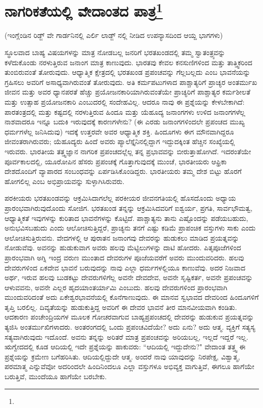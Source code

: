 
\chapter[ನಾಗರಿಕತೆಯಲ್ಲಿ ವೇದಾಂತದ ಪಾತ್ರ]{ನಾಗರಿಕತೆಯಲ್ಲಿ ವೇದಾಂತದ ಪಾತ್ರ\protect\footnote{}}

\begin{center}
(ಇಂಗ್ಲೆಂಡಿನ ರಿಡ್ಜ್ ವೇ ಗಾರ್ಡನಿನಲ್ಲಿ ಎರ್ಲಿ ಲಾಡ್ಜ್ ನಲ್ಲಿ ನೀಡಿದ ಉಪನ್ಯಾಸದಿಂದ ಆಯ್ದ ಭಾಗಗಳು)
\end{center}

ಸ್ಥೂಲವಾದ ಬಾಹ್ಯ ವಿಷಯಗಳನ್ನು ಮಾತ್ರ ನೋಡಬಲ್ಲ ಜನರಿಗೆ ಭರತಖಂಡದಲ್ಲಿ ತಮ್ಮ ಸ್ವಾತಂತ್ರ್ಯವನ್ನು ಕಳೆದುಕೊಂಡು ನರಳುತ್ತಿರುವ ಜನಾಂಗ ಮಾತ್ರ ಕಾಣುವುದು. ಭಾರತವು ಕೇವಲ ಕನಸುಣಿಗಳಿಂದ ಮತ್ತು ತಾತ್ತ್ವಿಕರಿಂದ ತುಂಬಿರುವಂತೆ ತೋರುವುದು. ಆಧ್ಯಾತ್ಮಿಕ ಕ್ಷೇತ್ರದಲ್ಲಿ ಭರತಖಂಡ ಪ್ರಪಂಚವನ್ನು ಗೆಲ್ಲಬಲ್ಲದು ಎಂಬ ಭಾವನೆಯನ್ನು ಗ್ರಹಿಸಲು ಅವರಿಗೆ ಅಸಾಧ್ಯವಾಗಿರುವಂತೆ ತೋರುವುದು. ಅತಿ ಕರ್ಮಪಟುಗಳಾದ ಪಾಶ್ಚಾತ್ಯರಿಗೆ ಪ್ರಾಚ್ಯರ ಅಂತರ್ಮುಖ ಜೀವನ ಮತ್ತು ಅವರ ಧ್ಯಾನಪರತೆ ಹೆಚ್ಚು ಪ್ರಯೋಜನಕಾರಿಯಾಗಿರುವಂತೆಯೇ ಪ್ರಾಚ್ಯರಿಗೆ ಪಾಶ್ಚಾತ್ಯರ ಕರ್ಮಶೀಲತೆ ಮತ್ತು ಉತ್ಸಾಹ ಪ್ರಯೋಜನಕಾರಿ ಎಂಬುದರಲ್ಲಿ ಸಂದೇಹವಿಲ್ಲ. ಆದರೂ ನಾವು ಈ ಪ್ರಶ್ನೆಯನ್ನು ಕೇಳಬೇಕಾಗಿದೆ: ಪಾರತಂತ್ರದಲ್ಲಿ ಮತ್ತು ಕಷ್ಟದಲ್ಲಿ ನರಳುತ್ತಿರುವ ಹಿಂದೂ ಮತ್ತು ಯೆಹೂದ್ಯ ಜನಾಂಗಗಳು ಉಳಿದ ಜನಾಂಗಗಳೆಲ್ಲ ನಾಶವಾದರೂ ಇನ್ನೂ ಬದುಕಿ ಇರುವುದಕ್ಕೆ ಕಾರಣಗಳೇನು? (ಈ ಎರಡು ಜನಾಂಗಗಳಿಂದಲೇ ಪ್ರಪಂಚದ ಮುಖ್ಯ ಧರ್ಮಗಳೆಲ್ಲ ಜನಿಸಿದುವು) ಇದಕ್ಕೆ ಉತ್ತರವೇ ಅವರ ಆಧ್ಯಾತ್ಮಿಕ ಶಕ್ತಿ. ಹಿಂದೂಗಳು ಈಗ ಮೌನವಾಗಿದ್ದರೂ ಜೀವಂತರಾಗಿರುವರು; ಯೆಹೂದ್ಯರು ಹಿಂದೆ ಅವರು ಪ್ಯಾಲೆಸ್ತೈನಿನಲ್ಲಿದ್ದಾಗ ಇದ್ದುದಕ್ಕಿಂತ ಹೆಚ್ಚಿನ ಸಂಖ್ಯೆಯಲ್ಲಿ ಇರುವರು. ಭಾರತೀಯ ತತ್ತ್ವಜ್ಞಾನ ನಾಗರಿಕ ಪ್ರಪಂಚದಲ್ಲೆಲ್ಲ ತನ್ನ ಪ್ರಭಾವವನ್ನು ಬೀರುತ್ತಾಹೋಗಿದೆ. ಇದರಂತೆಯೇ ಪೂರ್ವಕಾಲದಲ್ಲಿ, ಯೂರೋಪಿನ ಹೆಸರು ಪ್ರಪಂಚಕ್ಕೆ ಗೊತ್ತಾಗುವುದಕ್ಕೆ ಮುಂಚೆ, ಭಾರತೀಯರು ಆಫ್ರಿಕಾ ದೇಶದೊಂದಿಗೆ ವ್ಯಾಪಾರದ ಸಂಬಂಧವನ್ನು ಏರ್ಪಡಿಸಿಕೊಂಡಿದ್ದರು. ಭಾರತೀಯರು ತಮ್ಮ ದೇಶ ಬಿಟ್ಟು ಹೊರಗೆ ಹೋಗಲಿಲ್ಲ ಎಂಬ ಅಭಿಪ್ರಾಯವನ್ನು ಸುಳ್ಳಾಗಿಸಿರುವರು.

ಪರಕೀಯರು ಭರತಖಂಡವನ್ನು ಆಕ್ರಮಿಸಿದಾಗಲೆಲ್ಲ ಪರಕೀಯರ ಜೀವನಗತಿಯಲ್ಲಿ ಹೊಸದೊಂದು ಅಧ್ಯಾಯ ಪ್ರಾರಂಭವಾಗಿರುವುದೊಂದು ಸೋಜಿಗ. ಭರತಖಂಡ ತನ್ನನ್ನು ಆಕ್ರಮಿಸಿದವರಿಗೆ ಐಶ್ವರ್ಯ, ಪ್ರಗತಿ, ಸಾರ್ವಭೌಮತ್ವ, ಆಧ್ಯಾತ್ಮಿಕತೆ ಇವುಗಳನ್ನು ಕುರಿತಾದ ಭಾವನೆಗಳನ್ನು ಕೊಟ್ಟಿದೆ. ಪಾಶ್ಚಾತ್ಯನು ತಾನು ಎಷ್ಟೊಂದನ್ನು ಪಡೆಯಬಹುದು, ಅನುಭವಿಸಬಹುದು ಎಂದು ಆಲೋಚಿಸುತ್ತಿದ್ದರೆ, ಪ್ರಾಚ್ಯನು ತನಗೆ ಎಷ್ಟು ಕಡಿಮೆ ಪ್ರಾಪಂಚಿಕ ವಸ್ತುಗಳು ಸಾಕು ಎಂದು ಆಲೋಚಿಸುತ್ತಿರುವನು. ವೇದಗಳಲ್ಲಿ ಆ ಪುರಾತನ ಜನಾಂಗವು ದೇವರನ್ನು ಹುಡುಕಲು ಮಾಡಿದ ಪ್ರಯತ್ನವನ್ನು ನೋಡುವೆವು. ಅವನನ್ನು ಹುಡುಕುವಾಗ ಅವರು ಹಲವು ಮೆಟ್ಟಿಲುಗಳನ್ನು ದಾಟಿ ಹೋದರು. ಪಿತೃಪೂಜೆಗಳಿಂದ ಪ್ರಾರಂಭವಾಗಿ ಅಗ್ನಿ ಇಂದ್ರ ವರುಣ ಮುಂತಾದ ದೇವರುಗಳ ಪೂಜೆಯವರೆಗೆ ಅವರು ಮುಂದುವರಿದರು. ಹಲವು ದೇವರುಗಳಿಂದ ಏಕದೇವ ಭಾವನೆ ಬರುವುದನ್ನು ನಾವು ಎಲ್ಲಾ ಧರ್ಮಗಳಲ್ಲಿಯೂ ಕಾಣುವೆವು. ಅದರ ನಿಜವಾದ ಅರ್ಥ, ಇರುವ ಹಲವು ಬುಡಕಟ್ಟು ದೇವರುಗಳಿಗೆಲ್ಲ ಅವನೇ ದೇವದೇವ, ಅವನೇ ಸೃಷ್ಟಿಕರ್ತ, ಅವನೇ ಪ್ರಪಂಚವನ್ನು ಆಳುವವನು, ಅವನೇ ಎಲ್ಲರ ಹೃದಯಾಂತರ್ಯಾಮಿ ಎಂಬುದು. ಹಲವು ದೇವರುಗಳಿಂದ ಪ್ರಾರಂಭವಾಗಿ ಮುಂದುವರಿದಂತೆ ಅದು ಏಕೇಶ್ವರಭಾವನೆಯಲ್ಲಿ ಕೊನೆಗಾಣುವುದು. ಈ ಮಾನವ ಸ್ವಭಾವದ ದೇವರಿಂದ ಹಿಂದೂಗಳಿಗೆ ತೃಪ್ತಿ ಬರಲಿಲ್ಲ. ದಿವ್ಯತೆಯನ್ನು ಹುಡುಕುತ್ತಿದ್ದ ಅವರಿಗೆ ಈ ದೇವರ ಭಾವನೆ ತೀರ ಮಾನವೀಯವಾಗಿ ಕಂಡಿತು. ಆದಕಾರಣ ಪಂಚೇಂದ್ರಿಯಗಳ ಮೂಲಕ ಗೋಚರವಾಗುವ ಬಾಹ್ಯಪ್ರಪಂಚದಲ್ಲಿ ದೇವರನ್ನು ಹುಡುಕುವ ಪ್ರಯತ್ನವನ್ನು ತ್ಯಜಿಸಿ ಅಂತರ್ಮುಖಿಗಳಾದರು. ಅಂತರಂಗದಲ್ಲಿ ಒಂದು ಪ್ರಪಂಚವಿದೆಯೇ? ಅದು ಏನು? ಅದು ಆತ್ಮ. ವ್ಯಕ್ತಿಗೆ ಸತ್ಯಸ್ಯ ಸತ್ಯವಾಗಿರುವುದು ಇದೊಂದೆ. ಅವನು ತನ್ನನ್ನು ಅರಿತರೆ ಮಾತ್ರ ಪ್ರಪಂಚವನ್ನು ಅರಿಯಬಲ್ಲ, ಇಲ್ಲದೆ ಇದ್ದರೆ ಇಲ್ಲ. ಋಗ್ವೇದದಲ್ಲಿ ಕೂಡ ಆದಿಯಲ್ಲಿ ಇದೇ ಪ್ರಶ್ನೆಯನ್ನು ಹಾಕುವರು: “ಆದಿಯಲ್ಲಿ ಇದ್ದುದೇನು?" ವೇದಾಂತ ತತ್ತ್ವ ಈ ಪ್ರಶ್ನೆಯನ್ನು ಕ್ರಮೇಣ ಬಗೆಹರಿಸಿತು. ಆದಿಯಲ್ಲಿದ್ದುದೇ ಆತ್ಮ. ಅಂದರೆ ನಾವು ಯಾವುದನ್ನು ನಿರಪೇಕ್ಷ, ವಿಶ್ವಾತ್ಮ, ಪರಮಾತ್ಮ ಎನ್ನುವೆವೋ ಅದರಿಂದಲೇ ಹಿಂದಿನಿಂದಲೂ ಎಲ್ಲಾ ವಸ್ತುಗಳೂ ಅಭಿವ್ಯಕ್ತ ವಾಗುತ್ತಿವೆ, ಈಗಲೂ ಹಾಗೆಯೇ ಬರುತ್ತಿವೆ, ಮುಂದೆಯೂ ಹಾಗೆಯೇ ಬರಬೇಕು.

